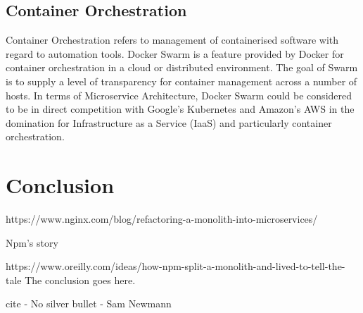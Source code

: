 \documentclass[journal]{IEEEtran}
\begin{document}
\subsection*{Container Orchestration}
Container Orchestration refers to management of containerised software with regard to automation tools. Docker Swarm \cite{dockerswarm} is a feature provided by Docker for container orchestration in a cloud or distributed environment. The goal of Swarm is to supply a level of transparency for container management across a number of hosts.  
In terms of Microservice Architecture, Docker Swarm could be considered to be in direct competition with Google's Kubernetes \cite{swarmkubernetes} and Amazon's AWS in the domination for Infrastructure as a Service (IaaS) and particularly container orchestration.

\section{Conclusion}


https://www.nginx.com/blog/refactoring-a-monolith-into-microservices/

Npm’s story

https://www.oreilly.com/ideas/how-npm-split-a-monolith-and-lived-to-tell-the-tale
The conclusion goes here.

cite - No silver bullet - Sam Newmann

\printbibliography

\end{document}
